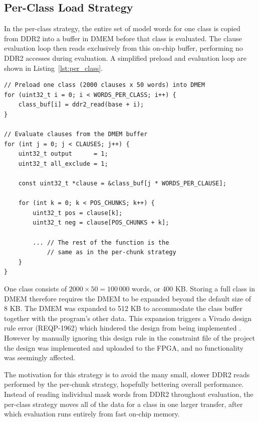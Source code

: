 \subsection{Per-Class Load Strategy}
\label{sec:per_class}

In the per-class strategy, the entire set of model words for one class is copied from DDR2 into a buffer in DMEM before that class is evaluated. The clause evaluation loop then reads exclusively from this on-chip buffer, performing no DDR2 accesses during evaluation. A simplified preload and evaluation loop are shown in Listing~\ref{lst:per_class}.

\begin{code}
\label{lst:per_class}
\begin{verbatim}
// Preload one class (2000 clauses x 50 words) into DMEM
for (uint32_t i = 0; i < WORDS_PER_CLASS; i++) {
    class_buf[i] = ddr2_read(base + i);
}

// Evaluate clauses from the DMEM buffer
for (int j = 0; j < CLAUSES; j++) {
    uint32_t output      = 1;
    uint32_t all_exclude = 1;

    const uint32_t *clause = &class_buf[j * WORDS_PER_CLAUSE];
    
    for (int k = 0; k < POS_CHUNKS; k++) {
        uint32_t pos = clause[k];
        uint32_t neg = clause[POS_CHUNKS + k];
    
        ... // The rest of the function is the
            // same as in the per-chunk strategy
    }
}
\end{verbatim}
\end{code}

One class consists of $2000 \times 50 = 100\,000$ words, or 400 KB. Storing a full class in DMEM therefore requires the DMEM to be expanded beyond the default size of 8 KB. The DMEM was expanded to 512 KB to accommodate the class buffer together with the program's other data. This expansion triggers a Vivado design rule error (REQP-1962) which hindered the design from being implemented \cite{amd_community_reqp1962}. However by manually ignoring this design rule in the constraint file of the project the design was implemented and uploaded to the FPGA, and no functionality was seemingly affected.

The motivation for this strategy is to avoid the many small, slower DDR2 reads performed by the per-chunk strategy, hopefully bettering overall performance. Instead of reading individual mask words from DDR2 throughout evaluation, the per-class strategy moves all of the data for a class in one larger transfer, after which evaluation runs entirely from fast on-chip memory.



